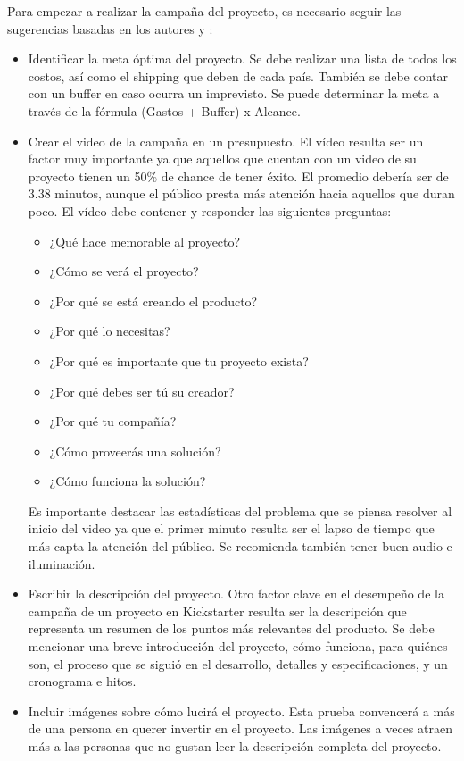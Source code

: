 Para empezar a realizar la campaña del proyecto, es necesario seguir las sugerencias basadas en los autores \cite{cr_yu2017kickstarter_course} y \cite{cr_kickstarter_intro}:
\begin{itemize}
	\item Identificar la meta óptima del proyecto. Se debe realizar una lista de todos los costos, así como el shipping que deben de cada país. También se debe contar con un buffer en caso ocurra un imprevisto. Se puede determinar la meta a través de la fórmula (Gastos + Buffer) x Alcance.
	\item Crear el video de la campaña en un presupuesto. El vídeo resulta ser un factor muy importante ya que aquellos que cuentan con un video de su proyecto tienen un 50\% de chance de tener éxito. El promedio debería ser de 3.38 minutos, aunque el público presta más atención hacia aquellos que duran poco. El vídeo debe contener y responder las siguientes preguntas:
	\begin{itemize}
		\item ¿Qué hace memorable al proyecto?
		\item ¿Cómo se verá el proyecto?
		\item ¿Por qué se está creando el producto?
		\item ¿Por qué lo necesitas?
		\item ¿Por qué es importante que tu proyecto exista?
		\item ¿Por qué debes ser tú su creador?
		\item ¿Por qué tu compañía?
		\item ¿Cómo proveerás una solución?
		\item ¿Cómo funciona la solución?
	\end{itemize}
	Es importante destacar las estadísticas del problema que se piensa resolver al inicio del video ya que el primer minuto resulta ser el lapso de tiempo que más capta la atención del público. Se recomienda también tener buen audio e iluminación.
	\item Escribir la descripción del proyecto. Otro factor clave en el desempeño de la campaña de un proyecto en Kickstarter resulta ser la descripción que representa un resumen de los puntos más relevantes del producto. Se debe mencionar una breve introducción del proyecto, cómo funciona, para quiénes son, el proceso que se siguió en el desarrollo, detalles y especificaciones, y un cronograma e hitos.
	\item Incluir imágenes sobre cómo lucirá el proyecto. Esta prueba convencerá a más de una persona en querer invertir en el proyecto. Las imágenes a veces atraen más a las personas que no gustan leer la descripción completa del proyecto.

\end{itemize}
